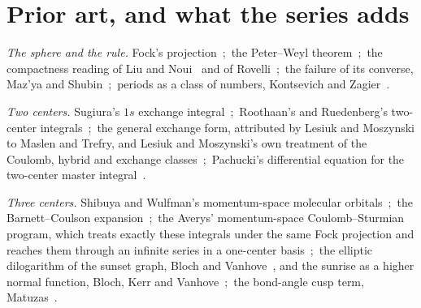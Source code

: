 \documentclass[aps,pra,twocolumn,superscriptaddress,longbibliography]{revtex4-2}
\begin{document}
\section{Prior art, and what the series adds}
\label{sec:prior}

\emph{The sphere and the rule.}  Fock's projection~\cite{fock1935};\
the Peter--Weyl theorem~\cite{peter_weyl1927};\ the compactness reading
of Liu and Noui~\cite{liu_noui2017} and of
Rovelli~\cite{rovelli1996};\ the failure of its converse, Maz'ya and
Shubin~\cite{mazya_shubin2005};\ periods as a class of numbers,
Kontsevich and Zagier~\cite{kontsevich_zagier2001}.

\emph{Two centers.}  Sugiura's $1s$ exchange
integral~\cite{sugiura1927};\ Roothaan's and Ruedenberg's two-center
integrals~\cite{roothaan1951,ruedenberg1951};\ the general exchange
form, attributed by Lesiuk and Moszynski to Maslen and Trefry, and
Lesiuk and Moszynski's own treatment of the Coulomb, hybrid and exchange
classes~\cite{lesiuk2014a,lesiuk2014b};\ Pachucki's differential
equation for the two-center master integral~\cite{pachucki2009}.

\emph{Three centers.}  Shibuya and Wulfman's momentum-space molecular
orbitals~\cite{shibuya1965};\ the Barnett--Coulson
expansion~\cite{barnett_coulson1951};\ the Averys' momentum-space
Coulomb--Sturmian program, which treats exactly these integrals under
the same Fock projection and reaches them through an infinite series in
a one-center basis~\cite{avery_avery_book2018,avery2013};\ the elliptic
dilogarithm of the sunset graph, Bloch and
Vanhove~\cite{blochvanhove2015}, and the sunrise as a higher normal
function, Bloch, Kerr and Vanhove~\cite{blochkerrvanhove2015};\ the
bond-angle cusp term, Matuzas~\cite{matuzas2026sc}.
\end{document}
